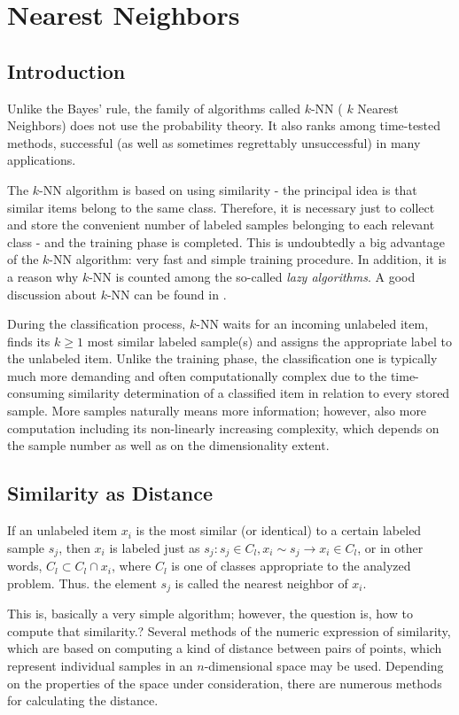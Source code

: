 \chapter{Nearest Neighbors}
\section{Introduction}
Unlike the Bayes' rule, the family of algorithms called $k$-NN ( $k$ Nearest Neighbors) does not use the probability theory. It also ranks among time-tested methods, successful (as well as sometimes regrettably unsuccessful) in many applications.

The $k$-NN algorithm is based on using similarity - the principal idea is that similar items belong to the same class. Therefore, it is necessary just to collect and store the convenient number of labeled samples belonging to each relevant class - and the training phase is completed. This is undoubtedly a big advantage of the $k$-NN algorithm: very fast and simple training procedure. In addition, it is a reason why $k$-NN is counted among the so-called \textit{lazy algorithms}. A good discussion about $k$-NN can be found in \cite{ref76}.

During the classification process, $k$-NN waits for an incoming unlabeled item, finds its $k \geq 1$ most similar labeled sample(s) and assigns the appropriate label to the unlabeled item. Unlike the training phase, the classification one is typically much more demanding and often computationally complex due to the time-consuming similarity determination of a classified item in relation to every stored sample. More samples naturally means more information; however, also more computation including its non-linearly increasing complexity, which depends on the sample number as well as on the dimensionality extent.

\section{Similarity as Distance}
If an unlabeled item $x_{i}$ is the most similar (or identical) to a certain labeled sample $s_{j}$, then $x_{i}$ is labeled just as $s_{j}: s_{j} \in C_{l}, x_{i} \sim s_{j} \rightarrow x_{i} \in C_{l}$, or in other words, $C_{l} \subset C_{l} \cap x_{i}$, where $C_{l}$ is one of classes appropriate to the analyzed problem. Thus. the element $s_{j}$ is called the nearest neighbor of $x_{i}$.

This is, basically a very simple algorithm; however, the question is, how to compute that similarity.? Several methods of the numeric expression of similarity, which are based on computing a kind of distance between pairs of points, which represent individual samples in an $n$-dimensional space may be used. Depending on the properties of the space under consideration, there are numerous methods for calculating the distance.

